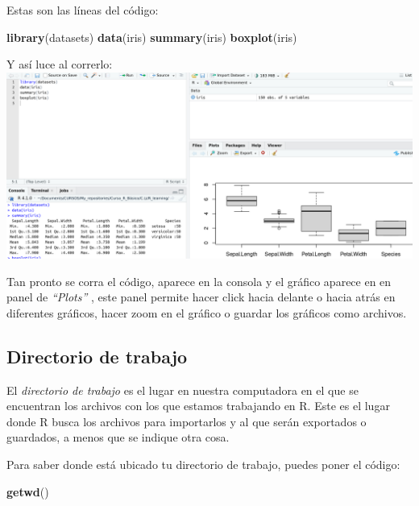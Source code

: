 \documentclass[
]{book}
\newenvironment{Shaded}{\begin{snugshade}}{\end{snugshade}}
\newcommand{\FunctionTok}[1]{\textcolor[rgb]{0.13,0.29,0.53}{\textbf{#1}}}
\newcommand{\NormalTok}[1]{#1}
\begin{document}
Estas son las líneas del código:

\begin{Shaded}
\begin{Highlighting}[]
\FunctionTok{library}\NormalTok{(datasets)}
\FunctionTok{data}\NormalTok{(iris)}
\FunctionTok{summary}\NormalTok{(iris)}
\FunctionTok{boxplot}\NormalTok{(iris)}
\end{Highlighting}
\end{Shaded}

Y así luce al correrlo:\\

\includegraphics[width=500pt]{images/code}

\hfill\break

Tan pronto se corra el código, aparece en la consola y el gráfico aparece en en panel de \emph{``Plots''} , este panel permite hacer click hacia delante o hacia atrás en diferentes gráficos, hacer zoom en el gráfico o guardar los gráficos como archivos.

\subsection{Directorio de trabajo}\label{directorio-de-trabajo}

El \emph{directorio de trabajo} es el lugar en nuestra computadora en el que se encuentran los archivos con los que estamos trabajando en R.
Este es el lugar donde R busca los archivos para importarlos y al que serán exportados o guardados, a menos que se indique otra cosa.

Para saber donde está ubicado tu directorio de trabajo, puedes poner el código:

\begin{Shaded}
\begin{Highlighting}[]
\FunctionTok{getwd}\NormalTok{()}
\end{Highlighting}
\end{Shaded}
\end{document}
